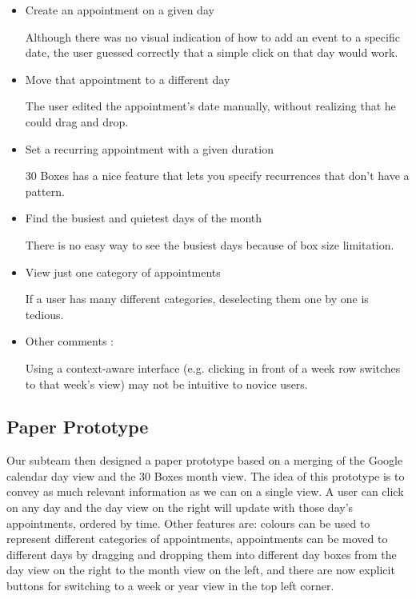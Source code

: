 \documentclass{article}
\begin{document}
\begin{itemize}
\item Create an appointment on a given day

Although there was no visual indication of how to add an event to a specific
date, the user guessed correctly that a simple click on that day would work.

\item Move that appointment to a different day

The user edited the appointment's date manually, without realizing that he
could drag and drop.

\item Set a recurring appointment with a given duration

30 Boxes has a nice feature that lets you specify recurrences that don't have
a pattern.

\item Find the busiest and quietest days of the month

There is no easy way to see the busiest days because of box size limitation.

\item View just one category of appointments

If a user has many different categories, deselecting them one by one is tedious.

\item Other comments :

Using a context-aware interface (e.g. clicking in front of a week row switches
to that week's view) may not be intuitive to novice users.

\end{itemize}

\subsection{Paper Prototype}

Our subteam then designed a paper prototype based on a merging of the Google
calendar day view and the 30 Boxes month view. The idea of this prototype is
to convey as much relevant information as we can on a single view. A user can
click on any day and the day view on the right will update with those day's
appointments, ordered by time. Other features are: colours can be used to 
represent different categories of appointments, appointments can be moved to 
different days by dragging and dropping them into different day boxes from the 
day view on the right to the month view on the left, and there are now explicit 
buttons for switching to a week or year view in the top left corner. 
\end{document}
